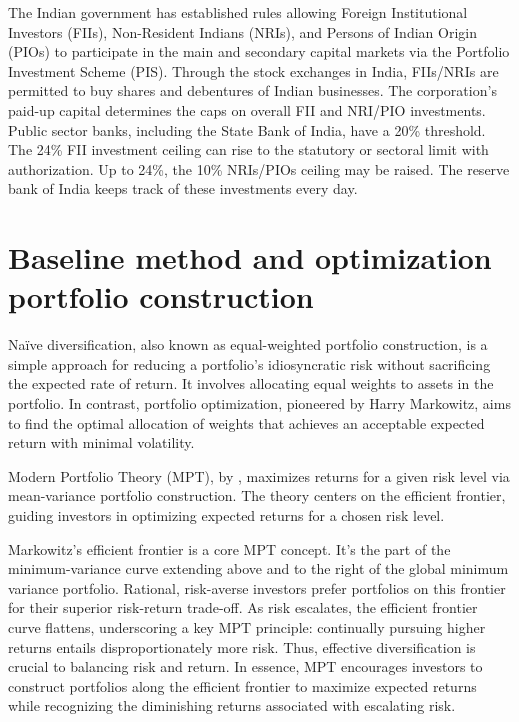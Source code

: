 The Indian government has established rules allowing Foreign Institutional Investors (FIIs), Non-Resident Indians (NRIs), and Persons of Indian Origin (PIOs) to participate in the main and secondary capital markets via the Portfolio Investment Scheme (PIS). Through the stock exchanges in India, FIIs/NRIs are permitted to buy shares and debentures of Indian businesses. The corporation's paid-up capital determines the caps on overall FII and NRI/PIO investments. Public sector banks, including the State Bank of India, have a 20\% threshold. The 24\% FII investment ceiling can rise to the statutory or sectoral limit with authorization. Up to 24\%, the 10\% NRIs/PIOs ceiling may be raised. The reserve bank of India keeps track of these investments every day. \citep{rbi_foreign_investment}

\section{Baseline method and optimization portfolio construction}
Naïve diversification, also known as equal-weighted portfolio construction, is a simple approach for reducing a portfolio's idiosyncratic risk without sacrificing the expected rate of return. It involves allocating equal weights to assets in the portfolio. In contrast, portfolio optimization, pioneered by Harry Markowitz, aims to find the optimal allocation of weights that achieves an acceptable expected return with minimal volatility.

Modern Portfolio Theory (MPT), by \citep{Markowitz1952}, maximizes returns for a given risk level via mean-variance portfolio construction. The theory centers on the efficient frontier, guiding investors in optimizing expected returns for a chosen risk level.

Markowitz's efficient frontier is a core MPT concept. It's the part of the minimum-variance curve extending above and to the right of the global minimum variance portfolio. Rational, risk-averse investors prefer portfolios on this frontier for their superior risk-return trade-off. As risk escalates, the efficient frontier curve flattens, underscoring a key MPT principle: continually pursuing higher returns entails disproportionately more risk. Thus, effective diversification is crucial to balancing risk and return. In essence, MPT encourages investors to construct portfolios along the efficient frontier to maximize expected returns while recognizing the diminishing returns associated with escalating risk.

